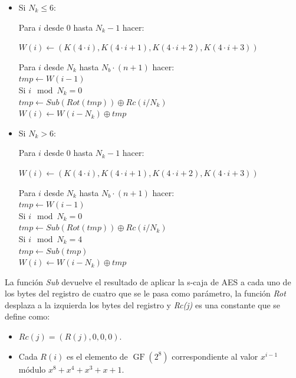 \begin{itemize}
	\item Si $N_k\le6$:
	\begin{algorithm}
		Para $i$ desde 0 hasta $N_{k}-1$ hacer:
		\begin{description}
			$W(i)\leftarrow(K(4·i), K(4·i+1), K(4·i+2), K(4·i+3))$
		\end{description}
		Para $i$ desde $N_k$ hasta $N_{b}·(n+1)$ hacer:\\
			\hspace*{20}$tmp\leftarrow W(i-1)$\\
			\hspace*{20}Si $i \mod N_k = 0$\\
			\hspace*{40}$tmp\leftarrow Sub(Rot(tmp))\oplus Rc(i/N_k)$\\
			\hspace*{20}$W(i)\leftarrow W(i-N_k)\oplus tmp$
	\end{algorithm}
	\item Si $N_k>6$:
	\begin{algorithm}
		Para $i$ desde 0 hasta $N_{k}-1$ hacer:
		\begin{description}
			$W(i)\leftarrow(K(4·i), K(4·i+1), K(4·i+2), K(4·i+3))$
		\end{description}
		Para $i$ desde $N_k$ hasta $N_{b}·(n+1)$ hacer:\\
			\hspace*{20}$tmp\leftarrow W(i-1)$\\
			\hspace*{20}Si $i \mod N_k = 0$\\
			\hspace*{40}$tmp\leftarrow Sub(Rot(tmp))\oplus Rc(i/N_k)$\\
			\hspace*{20}Si $i \mod N_k = 4$\\
			\hspace*{40}$tmp\leftarrow Sub(tmp)$\\
			\hspace*{20}$W(i)\leftarrow W(i-N_k)\oplus tmp$
	\end{algorithm}
\end{itemize}

La función \emph{Sub} devuelve el resultado de aplicar la s-caja de AES a cada uno de los bytes del registro de cuatro que se le pasa como parámetro, la función \emph{Rot} desplaza a la izquierda los bytes del registro y \emph{Rc(j)} es una constante que se define como:
\begin{itemize}
	\item $Rc(j)=(R(j),0,0,0)$.
	\item Cada $R(i)$ es el elemento de $\operatorname{GF}(2^8)$ correspondiente al valor $x^{i-1}$ módulo $x^8+x^4+x^3+x+1$.
\end{itemize}

